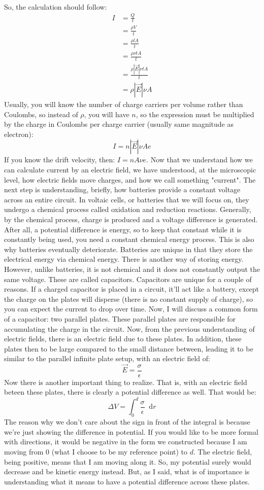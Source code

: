 \documentclass{article}
\newcommand*\dif{\mathop{}\!\mathrm{d}}
\begin{document}
\\
So, the calculation should follow:
\begin{align*}
I &= \frac{Q}{t}\\
&= \frac{\rho V}{t}\\
&= \frac{\rho lA}{t}\\
&= \frac{\rho \nu t A}{t}\\
&= \frac{\rho |\vec{E}|\nu t A}{t}\\
&= \rho |\vec{E}|\nu A
\end{align*}
Usually, you will know the number of charge carriers per volume rather than Coulombs, so instead of $\rho$, you will have $n$, so the expression must be multiplied by the charge in Coulombs per charge carrier (usually same magnitude as electron): $$I = n|\vec{E}|\nu Ae$$If you know the drift velocity, then: $I = nA\nu e$. 
Now that we understand how we can calculate current by an electric field, we have understood, at the microscopic level, how electric fields move charges, and how we call something "current". The next step is understanding, briefly, how batteries provide a constant voltage across an entire circuit. In voltaic cells, or batteries that we will focus on, they undergo a chemical process called oxidation and reduction reactions. Generally, by the chemical process, charge is produced and a voltage difference is generated. After all, a potential difference is energy, so to keep that constant while it is constantly being used, you need a constant chemical energy process. This is also why batteries eventually deteriorate. Batteries are unique in that they store the electrical energy via chemical energy. There is another way of storing energy. However, unlike batteries, it is not chemical and it does not constantly output the same voltage. These are called capacitors. Capacitors are unique for a couple of reasons. If a charged capacitor is placed in a circuit, it'll act like a battery, except the charge on the plates will disperse (there is no constant supply of charge), so you can expect the current to drop over time. Now, I will discuss a common form of a capacitor: two parallel plates. These parallel plates are responsible for accumulating the charge in the circuit. Now, from the previous understanding of electric fields, there is an electric field due to these plates. In addition, these plates then to be large compared to the small distance between, leading it to be similar to the parallel infinite plate setup, with an electric field of:$$\vec{E} = \frac{\sigma}{\epsilon}$$Now there is another important thing to realize. That is, with an electric field beteen these plates, there is clearly a potential difference as well. That would be: $$\Delta V = \int_0^d \frac{\sigma}{\epsilon} \dif r$$The reason why we don't care about the sign in front of the integral is because we're just showing the difference in potential. If you would like to be more formal with directions, it would be negative in the form we constructed because I am moving from $0$ (what I choose to be my reference point) to $d$. The electric field, being positive, means that I am moving along it. So, my potential surely would decrease and be kinetic energy instead. But, as I said, what is of importance is understanding what it means to have a potential difference across these plates. \\
\end{document}
